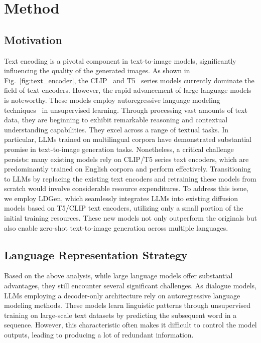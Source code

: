 \section{Method}

\subsection{Motivation}

Text encoding is a pivotal component in text-to-image models, significantly influencing the quality of the generated images. As shown in Fig.~\ref{fig:text_encoder}, the CLIP~\cite{radford2021learning} and T5~\cite{raffel2020exploring} series models currently dominate the field of text encoders. However, the rapid advancement of large language models~\cite{achiam2023gpt,team2024gemma} is noteworthy. These models employ autoregressive language modeling techniques~\cite{yang2019xlnet,black2022gpt} in unsupervised learning. Through processing vast amounts of text data, they are beginning to exhibit remarkable reasoning and contextual understanding capabilities. 
They excel across a range of textual tasks. In particular, LLMs trained on multilingual corpora have demonstrated substantial promise in text-to-image generation tasks. Nonetheless, a critical challenge persists: many existing models rely on CLIP/T5 series text encoders, which are predominantly trained on English corpora and perform effectively. 
Transitioning to LLMs by replacing the existing text encoders and retraining these models from scratch would involve considerable resource expenditures. To address this issue, we employ LDGen, which seamlessly integrates LLMs into existing diffusion models based on T5/CLIP text encoders, utilizing only a small portion of the initial training resources. These new models not only outperform the originals but also enable zero-shot text-to-image generation across multiple languages.






\subsection{Language Representation Strategy}

Based on the above analysis, while large language models offer substantial advantages, they still encounter several significant challenges. As dialogue models, LLMs employing a decoder-only architecture rely on autoregressive language modeling methods. These models learn linguistic patterns through unsupervised training on large-scale text datasets by predicting the subsequent word in a sequence. However, this characteristic often makes it difficult to control the model outputs, leading to producing a lot of redundant information.

